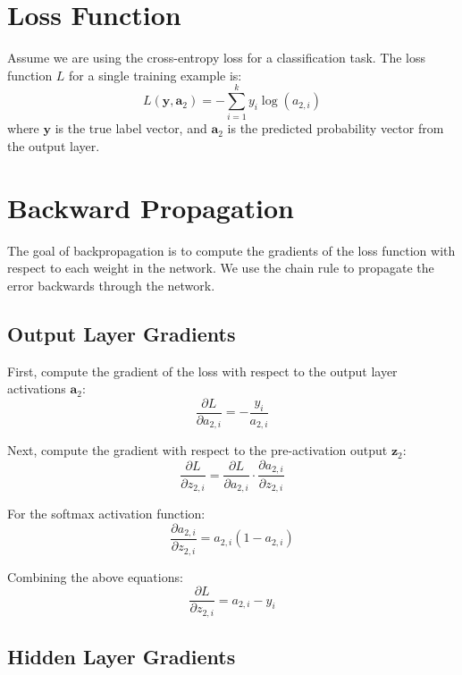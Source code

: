 \section{Loss Function}

Assume we are using the cross-entropy loss for a classification task. The loss function \(L\) for a single training example is:
\begin{equation}
L(\mathbf{y}, \mathbf{a}_{2}) = -\sum_{i=1}^{k} y_{i} \log(a_{2,i})
\end{equation}
where \(\mathbf{y}\) is the true label vector, and \(\mathbf{a}_{2}\) is the predicted probability vector from the output layer.

\section{Backward Propagation}

The goal of backpropagation is to compute the gradients of the loss function with respect to each weight in the network. We use the chain rule to propagate the error backwards through the network.

\subsection{Output Layer Gradients}

First, compute the gradient of the loss with respect to the output layer activations \(\mathbf{a}_{2}\):
\begin{equation}
\frac{\partial L}{\partial a_{2,i}} = -\frac{y_{i}}{a_{2,i}}
\end{equation}

Next, compute the gradient with respect to the pre-activation output \(\mathbf{z}_{2}\):
\begin{equation}
\frac{\partial L}{\partial z_{2,i}} = \frac{\partial L}{\partial a_{2,i}} \cdot \frac{\partial a_{2,i}}{\partial z_{2,i}}
\end{equation}

For the softmax activation function:
\begin{equation}
\frac{\partial a_{2,i}}{\partial z_{2,i}} = a_{2,i} (1 - a_{2,i})
\end{equation}

Combining the above equations:
\begin{equation}
\frac{\partial L}{\partial z_{2,i}} = a_{2,i} - y_{i}
\end{equation}

\subsection{Hidden Layer Gradients}

